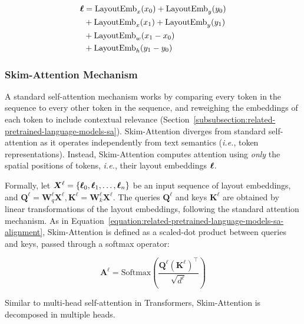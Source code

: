 \begin{equation}
\begin{split}
    \boldsymbol{\ell} & = \text{LayoutEmb}_x(x_0) + \text{LayoutEmb}_y(y_0) \\
    & + \text{LayoutEmb}_x(x_1) + \text{LayoutEmb}_y(y_1) \\
    & + \text{LayoutEmb}_w(x_1 - x_0) \\
    & + \text{LayoutEmb}_h(y_1 - y_0) \\
\end{split}
\end{equation}

\subsubsection{Skim-Attention Mechanism}

A standard self-attention mechanism works by comparing every token in the sequence to every other token in the sequence, and reweighing the embeddings of each token to include contextual relevance (Section~\ref{subsubsection:related-pretrained-language-models-sa}). Skim-Attention diverges from standard self-attention as it operates independently from text semantics (\textit{i.e.}, token representations). Instead, Skim-Attention computes attention using \emph{only} the spatial positions of tokens, \textit{i.e.}, their layout embeddings $\boldsymbol{\ell}$.

Formally, let $\bm{X}^{\ell} =  \{\boldsymbol{\ell}_0, \boldsymbol{\ell}_1, \ldots, \boldsymbol{\ell}_n\}$ be an input sequence of layout embeddings, and $\bm{Q}^{\ell} = \bm{W}^{\ell}_q \bm{X}^{\ell}, \bm{K}^{\ell} =  \bm{W}^{\ell}_k \bm{X}^{\ell}$. The queries $\bm{Q}^{\ell}$ and keys $\bm{K}^{\ell}$ are obtained by linear transformations of the layout embeddings, following the standard attention mechanism. As in Equation~\ref{equation:related-pretrained-language-models-sa-alignment}, Skim-Attention is defined as a scaled-dot product between queries and keys, passed through a softmax operator:

\begin{equation}
\label{eq:skim-attention-matrix}
    \bm{A}^{\ell} = \text{Softmax}\left(\dfrac{\bm{Q}^{\ell}\left(\bm{K}^{\ell}\right)^\top}{\sqrt{d^{\ell}}}\right)
\end{equation}

\noindent Similar to multi-head self-attention in Transformers, Skim-Attention is decomposed in multiple heads.

